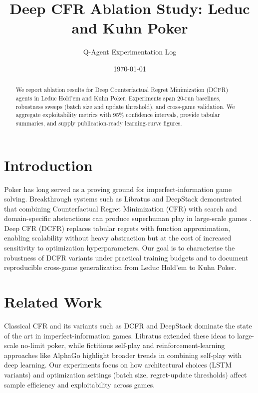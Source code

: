 \documentclass[11pt]{article}
\title{Deep CFR Ablation Study: Leduc and Kuhn Poker}
\author{Q-Agent Experimentation Log}
\date{\today}
\begin{document}
\maketitle

\begin{abstract}
We report ablation results for Deep Counterfactual Regret Minimization (DCFR) agents in Leduc Hold'em and Kuhn Poker. Experiments span 20-run baselines, robustness sweeps (batch size and update threshold), and cross-game validation. We aggregate exploitability metrics with 95\% confidence intervals, provide tabular summaries, and supply publication-ready learning-curve figures.
\end{abstract}

\section{Introduction}
Poker has long served as a proving ground for imperfect-information game solving. Breakthrough systems such as Libratus and DeepStack demonstrated that combining Counterfactual Regret Minimization (CFR) \cite{zinkevich2007regret} with search and domain-specific abstractions can produce superhuman play in large-scale games \cite{brown2017libratus,moravvcik2017deepstack,brown2019superhuman}. Deep CFR (DCFR) \cite{brown2019deep} replaces tabular regrets with function approximation, enabling scalability without heavy abstraction but at the cost of increased sensitivity to optimization hyperparameters. Our goal is to characterise the robustness of DCFR variants under practical training budgets and to document reproducible cross-game generalization from Leduc Hold'em to Kuhn Poker.

\section{Related Work}
Classical CFR \cite{zinkevich2007regret} and its variants such as DCFR \cite{brown2019deep} and DeepStack \cite{moravvcik2017deepstack} dominate the state of the art in imperfect-information games. Libratus \cite{brown2017libratus} extended these ideas to large-scale no-limit poker, while fictitious self-play \cite{heinrich2015fictitious} and reinforcement-learning approaches like AlphaGo \cite{silver2016mastering,silver2017mastering} highlight broader trends in combining self-play with deep learning. Our experiments focus on how architectural choices (LSTM variants) and optimization settings (batch size, regret-update thresholds) affect sample efficiency and exploitability across games.
\end{document}
